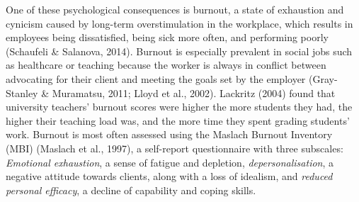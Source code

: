 \documentclass[
  english,
  man,floatsintext]{apa6}
\begin{document}
One of these psychological consequences is burnout, a state of exhaustion and cynicism caused by long-term overstimulation in the workplace, which results in employees being dissatisfied, being sick more often, and performing poorly (Schaufeli \& Salanova, 2014).
Burnout is especially prevalent in social jobs such as healthcare or teaching because the worker is always in conflict between advocating for their client and meeting the goals set by the employer (Gray-Stanley \& Muramatsu, 2011; Lloyd et al., 2002).
Lackritz (2004) found that university teachers' burnout scores were higher the more students they had, the higher their teaching load was, and the more time they spent grading students' work.
Burnout is most often assessed using the Maslach Burnout Inventory (MBI) (Maslach et al., 1997), a self-report questionnaire with three subscales: \emph{Emotional exhaustion}, a sense of fatigue and depletion, \emph{depersonalisation}, a negative attitude towards clients, along with a loss of idealism, and \emph{reduced personal efficacy}, a decline of capability and coping skills.
\end{document}

